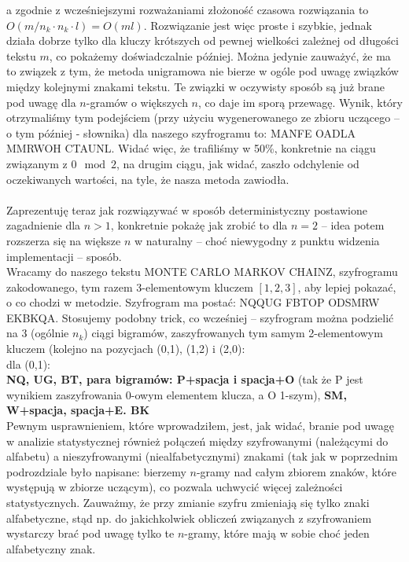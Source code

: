 \documentclass[a4paper]{article}
\theoremstyle{defn}
\theoremstyle{theorem}
\theoremstyle{lemma}
\theoremstyle{cor}
\theoremstyle{fact}
\begin{document}
a zgodnie z wcześniejszymi rozważaniami złożoność czasowa rozwiązania to $O(m/n_k \cdot n_k \cdot l) = O(ml)$. Rozwiązanie jest więc proste i szybkie, jednak działa dobrze tylko dla kluczy krótszych od pewnej wielkości zależnej od długości tekstu $m$, co pokażemy doświadczalnie później. Można jedynie zauważyć, że ma to związek z tym, że metoda unigramowa nie bierze w ogóle pod uwagę związków między kolejnymi znakami tekstu. Te związki w oczywisty sposób są już brane pod uwagę dla $n$-gramów o większych $n$, co daje im sporą przewagę. Wynik, który otrzymaliśmy tym podejściem (przy użyciu wygenerowanego ze zbioru uczącego – o tym później - słownika) dla naszego szyfrogramu to: MANFE OADLA MMRWOH CTAUNL. Widać więc, że trafiliśmy w 50\%, konkretnie na ciągu związanym z $0 \mod 2$, na drugim ciągu, jak widać, zaszło odchylenie od oczekiwanych wartości, na tyle, że nasza metoda zawiodła.\\\\
Zaprezentuję teraz jak rozwiązywać w sposób deterministyczny postawione zagadnienie dla $n > 1$, konkretnie pokażę jak zrobić to dla $n=2$ – idea potem rozszerza się na większe $n$ w naturalny – choć niewygodny z punktu widzenia implementacji – sposób.\\
Wracamy do naszego tekstu MONTE CARLO MARKOV CHAINZ, szyfrogramu zakodowanego, tym razem 3-elementowym kluczem $[1,2,3]$, aby lepiej pokazać, o co chodzi w metodzie. Szyfrogram ma postać: NQQUG FBTOP ODSMRW EKBKQA. Stosujemy podobny trick, co wcześniej – szyfrogram można podzielić na 3 (ogólnie $n_k$) ciągi bigramów, zaszyfrowanych tym samym 2-elementowym kluczem (kolejno na pozycjach (0,1), (1,2) i (2,0):\\
dla (0,1):\\
\textbf{NQ, UG, BT, para bigramów: P+spacja i spacja+O} (tak że P jest wynikiem zaszyfrowania 0-owym elementem klucza, a O 1-szym), \textbf{SM, W+spacja, spacja+E. BK}\\
Pewnym usprawnieniem, które wprowadziłem, jest, jak widać, branie pod uwagę w analizie statystycznej również połączeń między szyfrowanymi (należącymi do alfabetu) a nieszyfrowanymi (niealfabetycznymi) znakami (tak jak w poprzednim podrozdziale było napisane: bierzemy $n$-gramy nad całym zbiorem znaków, które występują w zbiorze uczącym), co pozwala uchwycić więcej zależności statystycznych. Zauważmy, że przy zmianie szyfru zmieniają się tylko znaki alfabetyczne, stąd np. do jakichkolwiek obliczeń związanych z szyfrowaniem wystarczy brać pod uwagę tylko te $n$-gramy, które mają w sobie choć jeden alfabetyczny znak.
\end{document}
